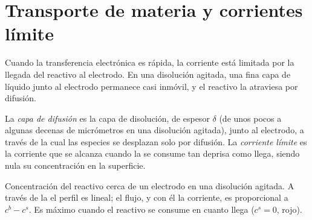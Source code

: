 \section{Transporte de materia y corrientes límite}

Cuando la transferencia electrónica es rápida, la corriente está limitada por la llegada del
reactivo al electrodo. En una disolución agitada, una fina capa de líquido
junto al electrodo permanece casi inmóvil, y el reactivo la atraviesa por
difusión.

\begin{definition}\label{def:b2:current-potential-curves:limiting-current}
La \emph{capa de difusión} es la capa de disolución,
de espesor $\delta$ (de unos pocos a algunas decenas de micrómetros en una disolución
agitada), junto al electrodo, a través de la cual las especies se desplazan solo por
difusión. La \emph{corriente límite} es la corriente
que se alcanza cuando la  se consume tan deprisa como llega, siendo
nula su concentración en la superficie.
\end{definition}

\begin{omfigure}

{\small Concentración del reactivo cerca de un electrodo en una disolución
agitada. A través de la  el perfil es lineal; el flujo, y con él la
corriente, es proporcional a $c^b - c^s$. Es máximo cuando el reactivo se
consume en cuanto llega ($c^s = 0$, rojo).}
\end{omfigure}

